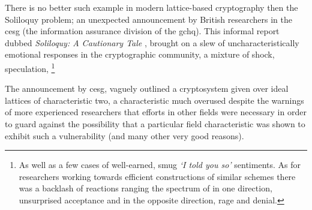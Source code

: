 There is no better such example in modern lattice-based cryptography then the Soliloquy problem; an unexpected announcement by British researchers in the \acrfull{cesg} (the information assurance division of the \acrshort{gchq}). This informal report dubbed \textit{Soliloquy: A Cautionary Tale} \cite{Cam2014}, brought on a slew of uncharacteristically emotional responses in the cryptographic community, a mixture of shock, speculation, \footnote{As well as a few cases of well-earned, smug \emph{`I told you so'} sentiments. As for researchers working towards efficient constructions of similar schemes there was a backlash of reactions ranging the spectrum of in one direction, unsurprised acceptance and in the opposite direction, rage and denial.} 

The announcement by \acrshort{cesg}, vaguely outlined a cryptosystem given over ideal lattices of characteristic two, a characteristic much overused despite the warnings of more experienced researchers \cite{Cra2015} that efforts in other fields were necessary in order to guard against the possibility that a particular field characteristic was shown to exhibit such a vulnerability (and many other very good reasons). 



